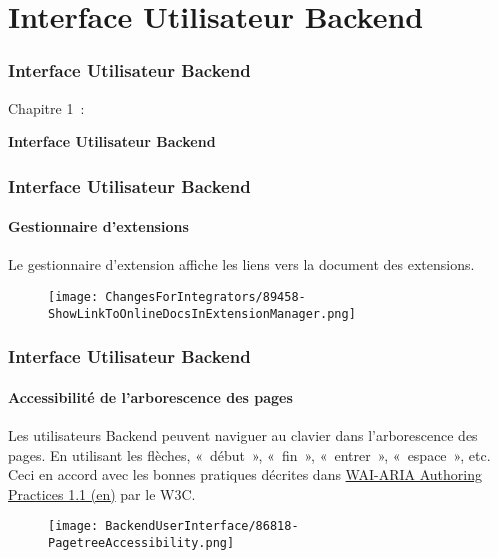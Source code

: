 %

\section{Interface Utilisateur Backend}
\begin{frame}[fragile]
	\frametitle{Interface Utilisateur Backend}

	\begin{center}\huge{Chapitre 1~:}\end{center}
	\begin{center}\huge{\color{typo3darkgrey}\textbf{Interface Utilisateur Backend}}\end{center}

\end{frame}


\begin{frame}[fragile]
	\frametitle{Interface Utilisateur Backend}
	\framesubtitle{Gestionnaire d'extensions}

	Le gestionnaire d'extension affiche les liens vers la document des extensions.

	\begin{figure}
		\texttt{[image: ChangesForIntegrators/89458-ShowLinkToOnlineDocsInExtensionManager.png]}
	\end{figure}

\end{frame}


\begin{frame}[fragile]
	\frametitle{Interface Utilisateur Backend}
	\framesubtitle{Accessibilité de l'arborescence des pages}

	Les utilisateurs Backend peuvent naviguer au clavier dans l'arborescence des pages.
	En utilisant les flèches, «~début~», «~fin~», «~entrer~», «~espace~», etc.
	\newline
	Ceci en accord avec les bonnes pratiques décrites dans
	\href{https://www.w3.org/TR/wai-aria-practices-1.1/#keyboard-interaction-22}{WAI-ARIA Authoring Practices 1.1 (en)}
	par le W3C.

	\begin{figure}
		\texttt{[image: BackendUserInterface/86818-PagetreeAccessibility.png]}
	\end{figure}

\end{frame}


